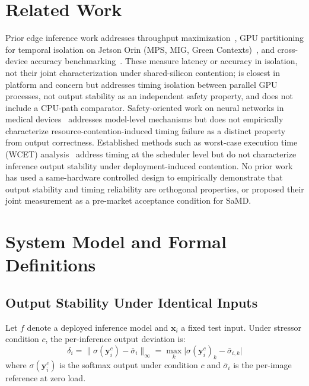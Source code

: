 \documentclass[journal,twoside,9pt]{IEEEtran}
\begin{document}
\section{Related Work}

Prior edge inference work addresses throughput maximization~\cite{hao2023},
GPU partitioning for temporal isolation on Jetson Orin (MPS, MIG, Green
Contexts)~\cite{marin2026}, and cross-device accuracy
benchmarking~\cite{baller2021,tobiasz2023}. These measure latency or accuracy in
isolation, not their joint characterization under shared-silicon contention;
\cite{marin2026} is closest in platform and concern but addresses timing
isolation between parallel GPU processes, not output stability as an independent
safety property, and does not include a CPU-path comparator.
Safety-oriented work on neural networks in medical devices~\cite{becker2019} addresses
model-level mechanisms but does not empirically characterize resource-contention-induced
timing failure as a distinct property from output correctness.
Established methods such as worst-case execution time (WCET) analysis~\cite{wilhelm2008}
address timing at the scheduler level but do not characterize inference output stability
under deployment-induced contention.
No prior work has used a same-hardware controlled design to empirically demonstrate
that output stability and timing reliability are orthogonal properties, or proposed
their joint measurement as a pre-market acceptance condition for SaMD.

\section{System Model and Formal Definitions}

\subsection{Output Stability Under Identical Inputs}

Let $f$ denote a deployed inference model and $\mathbf{x}_i$ a fixed test input.
Under stressor condition $c$, the per-inference output deviation is:
\begin{equation}
  \delta_i = \bigl\|\sigma(\mathbf{y}_i^c) - \bar{\sigma}_i\bigr\|_{\infty}
           = \max_k \bigl|\sigma(\mathbf{y}_i^c)_k - \bar{\sigma}_{i,k}\bigr|
  \label{eq:delta}
\end{equation}
where $\sigma(\mathbf{y}_i^c)$ is the softmax output under condition $c$ and
$\bar{\sigma}_i$ is the per-image reference at zero load.
\end{document}
